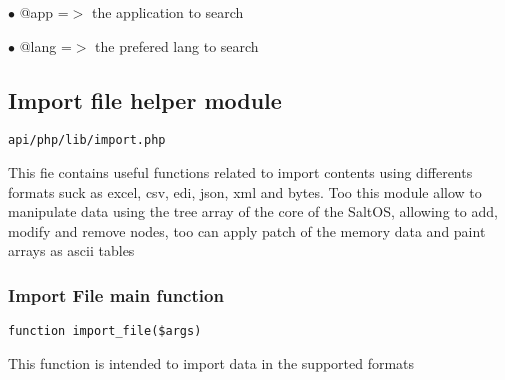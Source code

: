 \documentclass[a4paper]{article}
\begin{document}
\begin{compactitem}
\item[\color{myblue}$\bullet$] @app  =$>$ the application to search
\item[\color{myblue}$\bullet$] @lang =$>$ the prefered lang to search
\end{compactitem}

\hypertarget{toc462}{}
\subsection{Import file helper module}

\begin{lstlisting}
api/php/lib/import.php
\end{lstlisting}

This fie contains useful functions related to import contents using differents formats suck as
excel, csv, edi, json, xml and bytes. Too this module allow to manipulate data using the tree
array of the core of the SaltOS, allowing to add, modify and remove nodes, too can apply patch
of the memory data and paint arrays as ascii tables

\hypertarget{toc463}{}
\subsubsection{Import File main function}

\begin{lstlisting}
function import_file($args)
\end{lstlisting}

This function is intended to import data in the supported formats
\end{document}
